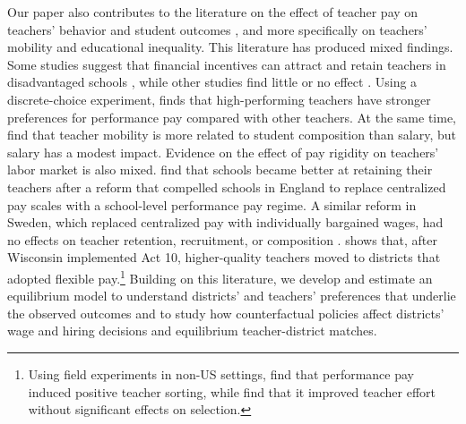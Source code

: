 \documentclass[notitlepage,12pt]{article}%
\begin{document}
Our paper also contributes to the literature on the effect of teacher pay on
teachers' behavior and student outcomes \citep [see][for
reviews]{neal2011design,jackson2014teacher}, and more specifically on
teachers' mobility and educational inequality. This literature has produced
mixed findings. Some studies suggest that financial incentives can attract and
retain teachers in disadvantaged schools
\citep[e.g.,][]{clotfelter2008would,steele2010financial,feng2018impact}, while
other studies find little or no effect
\citep[e.g.,][]{clotfelter2011teacher,russell2020ects}. Using a
discrete-choice experiment, \citet{johnston2021preferences} finds that
high-performing teachers have stronger preferences for performance pay
compared with other teachers. At the same time, \citet{hanushek2004public}
find that teacher mobility is more related to student composition than salary,
but salary has a modest impact. Evidence on the effect of pay rigidity on
teachers' labor market is also mixed. \citet{burgess2022deregulating} find
that schools became better at retaining their teachers after a reform that
compelled schools in England to replace centralized pay scales with a
school-level performance pay regime. A similar reform in Sweden, which
replaced centralized pay with individually bargained wages, had no effects on
teacher retention, recruitment, or composition
\citep{willen2021decentralization}. \citet{biasi2018labor} shows that, after
Wisconsin implemented Act 10, higher-quality teachers moved to districts that
adopted flexible pay.\footnote{Using field experiments in non-US settings,
\citet{brown2020inducing} find that performance pay induced positive teacher
sorting, while \citet{leaver2021recruitment} find that it improved teacher
effort without significant effects on selection.} Building on this literature,
we develop and estimate an equilibrium model to understand districts' and
teachers' preferences that underlie the observed outcomes and to study how
counterfactual policies affect districts' wage and hiring decisions and
equilibrium teacher-district matches.
\end{document}
